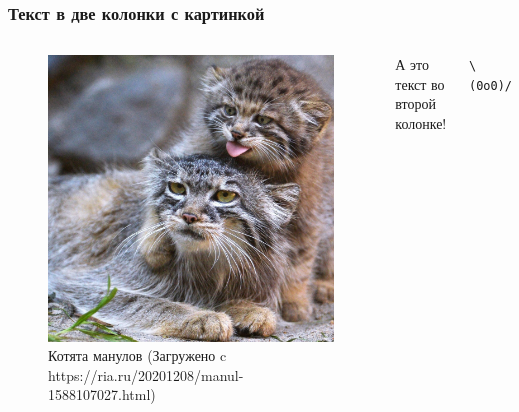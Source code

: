 \documentclass[10pt, hyperref={bookmarks=true}, aspectratio=169]{beamer}
\begin{document}
\begin{frame}
\frametitle{Текст в две колонки с картинкой}

\begin{columns}


\begin{figure}
    \centering
    \includegraphics[width=\columnwidth]{./img/manuls.jpg}
    \caption{{Котята манулов} \newline \tiny{(Загружено c https://ria.ru/20201208/manul-1588107027.html)}}
    \label{картинка:котята-манулов}
\end{figure}


А это текст во второй колонке!

\texttt{\textbackslash (0o0)/}

\end{columns}
\end{frame}

\end{document}
